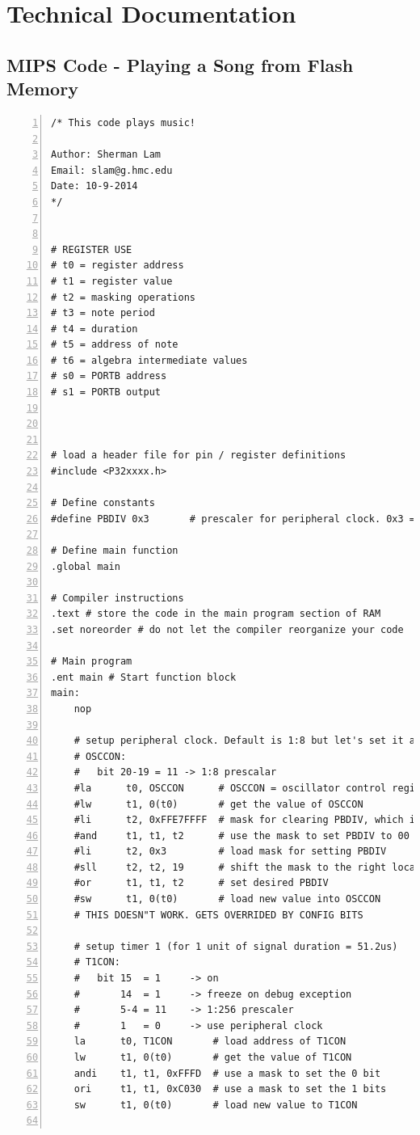 \documentclass[11pt]{article}
\begin{document}
\clearpage


\section{Technical Documentation}

\subsection{MIPS Code - Playing a Song from Flash Memory}

\begin{lstlisting}[numbers=left,basicstyle=\footnotesize]
/* This code plays music!

Author: Sherman Lam
Email: slam@g.hmc.edu
Date: 10-9-2014
*/


# REGISTER USE
# t0 = register address
# t1 = register value
# t2 = masking operations
# t3 = note period
# t4 = duration
# t5 = address of note
# t6 = algebra intermediate values
# s0 = PORTB address
# s1 = PORTB output



# load a header file for pin / register definitions
#include <P32xxxx.h>

# Define constants
#define PBDIV 0x3       # prescaler for peripheral clock. 0x3 = 1:8

# Define main function
.global main

# Compiler instructions
.text # store the code in the main program section of RAM
.set noreorder # do not let the compiler reorganize your code

# Main program
.ent main # Start function block
main:
    nop

    # setup peripheral clock. Default is 1:8 but let's set it anyways
    # OSCCON:
    #   bit 20-19 = 11 -> 1:8 prescalar
    #la      t0, OSCCON      # OSCCON = oscillator control register
    #lw      t1, 0(t0)       # get the value of OSCCON
    #li      t2, 0xFFE7FFFF  # mask for clearing PBDIV, which is bits 20-19
    #and     t1, t1, t2      # use the mask to set PBDIV to 00
    #li      t2, 0x3         # load mask for setting PBDIV
    #sll     t2, t2, 19      # shift the mask to the right location
    #or      t1, t1, t2      # set desired PBDIV
    #sw      t1, 0(t0)       # load new value into OSCCON
    # THIS DOESN"T WORK. GETS OVERRIDED BY CONFIG BITS

    # setup timer 1 (for 1 unit of signal duration = 51.2us)
    # T1CON:
    #   bit 15  = 1     -> on
    #       14  = 1     -> freeze on debug exception
    #       5-4 = 11    -> 1:256 prescaler
    #       1   = 0     -> use peripheral clock
    la      t0, T1CON       # load address of T1CON
    lw      t1, 0(t0)       # get the value of T1CON
    andi    t1, t1, 0xFFFD  # use a mask to set the 0 bit
    ori     t1, t1, 0xC030  # use a mask to set the 1 bits
    sw      t1, 0(t0)       # load new value to T1CON


\end{lstlisting}
\end{document}
